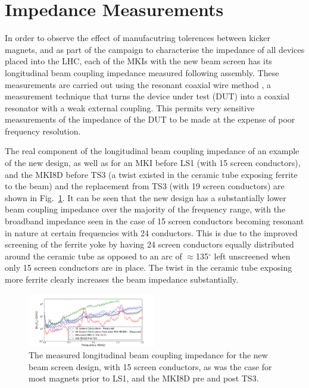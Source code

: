 \documentclass[a4paper,
              ]{jacow}
\begin{document}
\section{Impedance Measurements}

In order to observe the effect of manufacutring tolerences between kicker magnets, and as part of the campaign to characterise the impedance of all devices placed into the LHC, each of the MKIs with the new beam screen has its longitudinal beam coupling impedance measured following assembly. These measurements are carried out using the resonant coaxial wire method \cite{DayThesis}, a measurement technique that turns the device under test (DUT) into a coaxial resonator with a weak external coupling. This permits very sensitive measurements of the impedance of the DUT to be made at the expense of poor frequency resolution.

The real component of the longitudinal beam coupling impedance of an example of the new design, as well as for an MKI before LS1 (with 15 screen conductors), and the MKI8D before TS3 (a twist existed in the ceramic tube exposing ferrite to the beam) and the replacement from TS3 (with 19 screen conductors) are shown in Fig.~\ref{fig:Imp241915}. It can be seen that the new design has a substantially lower beam coupling impedance over the majority of the frequency range, with the broadband impedance seen in the case of 15 screen conductors becoming resonant in nature at certain frequencies with 24 conductors. This is due to the improved screening of the ferrite yoke by having 24 screen conductors equally distributed around the ceramic tube as opposed to an arc of $\approx$135$^{\circ}$ left unscreened when only 15 screen conductors are in place. The twist in the ceramic tube exposing more ferrite clearly increases the beam impedance substantially.

\begin{figure}
\includegraphics[width=0.5\textwidth]{TUPRI030f3.pdf}
\caption{The measured longitudinal beam coupling impedance for the new beam screen design, with 15 screen conductors, as was the case for most magnets prior to LS1, and the MKI8D pre and post TS3.}
\label{fig:Imp241915}
\end{figure}
\end{document}
